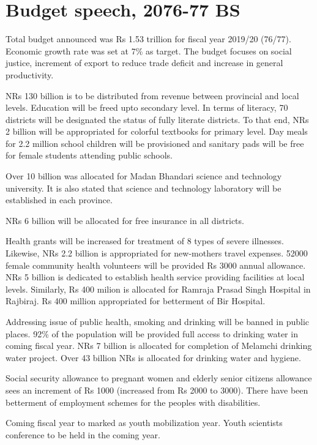 \documentclass[
]{book}
\begin{document}
\hypertarget{budget-speech-2076-77-bs}{%
\section{Budget speech, 2076-77 BS}\label{budget-speech-2076-77-bs}}

Total budget announced was Rs 1.53 trillion for fiscal year 2019/20 (76/77). Economic growth rate was set at 7\% as target. The budget focuses on social justice, increment of export to reduce trade deficit and increase in general productivity.

NRs 130 billion is to be distributed from revenue between provincial and local levels. Education will be freed upto secondary level. In terms of literacy, 70 districts will be designated the status of fully literate districts. To that end, NRs 2 billion will be appropriated for colorful textbooks for primary level. Day meals for 2.2 million school children will be provisioned and sanitary pads will be free for female students attending public schools.

Over 10 billion was allocated for Madan Bhandari science and technology university. It is also stated that science and technology laboratory will be established in each province.

NRs 6 billion will be allocated for free insurance in all districts.

Health grants will be increased for treatment of 8 types of severe illnesses. Likewise, NRs 2.2 billion is appropriated for new-mothers travel expenses. 52000 female community health volunteers will be provided Rs 3000 annual allowance. NRs 5 billion is dedicated to establish health service providing facilities at local levels. Similarly, Rs 400 milion is allocated for Ramraja Prasad Singh Hospital in Rajbiraj. Rs 400 million appropriated for betterment of Bir Hospital.

Addressing issue of public health, smoking and drinking will be banned in public places. 92\% of the population will be provided full access to drinking water in coming fiscal year. NRs 7 billion is allocated for completion of Melamchi drinking water project. Over 43 billion NRs is allocated for drinking water and hygiene.

Social security allowance to pregnant women and elderly senior citizens allowance sees an increment of Rs 1000 (increased from Rs 2000 to 3000). There have been betterment of employment schemes for the peoples with disabilities.

Coming fiscal year to marked as youth mobilization year. Youth scientists conference to be held in the coming year.
\end{document}
